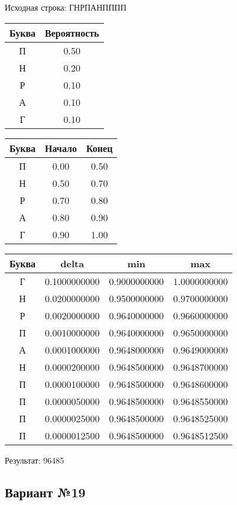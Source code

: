 \documentclass[a4paper, 12pt]{article}
\begin{document}
Исходная строка: ГНРПАНПППП\
\begin{center}
 \begin{tabular}{ |c|c| } 
  \hline
     Буква & Вероятность \\ \hline
П & 0.50\\\hline
Н & 0.20\\\hline
Р & 0.10\\\hline
А & 0.10\\\hline
Г & 0.10
\\ \hline \end{tabular}
\end{center}
\begin{center}
 \begin{tabular}{ |c|c|c| } 
  \hline
     Буква & Начало & Конец \\ \hline
П & 0.00 & 0.50\\\hline
Н & 0.50 & 0.70\\\hline
Р & 0.70 & 0.80\\\hline
А & 0.80 & 0.90\\\hline
Г & 0.90 & 1.00
\\ \hline \end{tabular}
\end{center}
\begin{center}
 \begin{tabular}{ |c|c|c|c| } 
  \hline
     Буква & delta & min & max \\ \hline
Г & 0.1000000000 & 0.9000000000 & 1.0000000000\\\hline
Н & 0.0200000000 & 0.9500000000 & 0.9700000000\\\hline
Р & 0.0020000000 & 0.9640000000 & 0.9660000000\\\hline
П & 0.0010000000 & 0.9640000000 & 0.9650000000\\\hline
А & 0.0001000000 & 0.9648000000 & 0.9649000000\\\hline
Н & 0.0000200000 & 0.9648500000 & 0.9648700000\\\hline
П & 0.0000100000 & 0.9648500000 & 0.9648600000\\\hline
П & 0.0000050000 & 0.9648500000 & 0.9648550000\\\hline
П & 0.0000025000 & 0.9648500000 & 0.9648525000\\\hline
П & 0.0000012500 & 0.9648500000 & 0.9648512500
\\ \hline \end{tabular}
\end{center}
Результат: 96485
\pagebreak
\subsection{Вариант №19}
\end{document}
